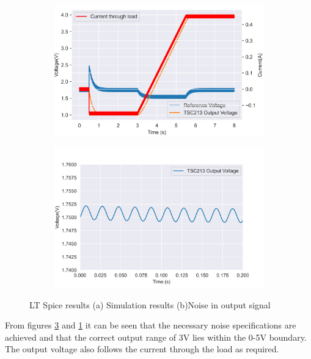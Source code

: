  \begin{figure}[!htb]
 \footnotesize
 \centering
    \begin{subfigure}[]{0.48\textwidth}
              \centering
  		\includegraphics[width=1\linewidth]{./Figures/circuit.png}
		    \caption{} \label{subfig:sim}
     \end{subfigure}
     \begin{subfigure}[]{0.5\textwidth}
             \centering
  		\includegraphics[width=1\linewidth]{./Figures/noise.png}
		   \caption{ } \label{subfig:noise}
     \end{subfigure}
   \caption[{Current Sense LTSpice Results}]{LT Spice results   (a)  Simulation results (b)Noise in output signal }
 
 \end{figure}

From figures \ref{subfig:noise} and \ref{subfig:sim} it can be seen that the necessary noise specifications are achieved and that the correct output range of 3V lies within the 0-5V boundary. The output voltage also follows the current through the load as required.






